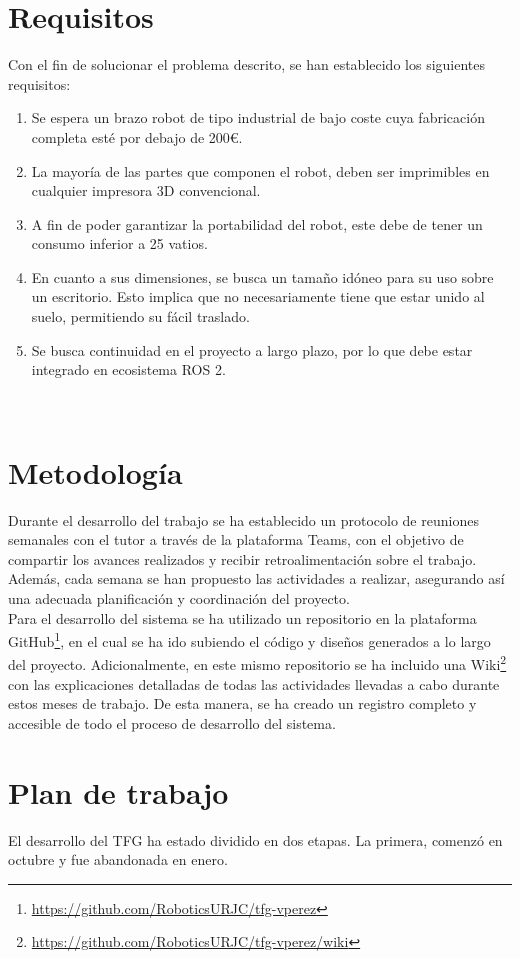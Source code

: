 \section{Requisitos}
\label{sec:requisitos}
Con el fin de solucionar el problema descrito, se han establecido los siguientes requisitos:
\begin{enumerate}
      \item Se espera un brazo robot de tipo industrial de bajo coste cuya fabricación completa esté por debajo de 200\euro.
      \item La mayoría de las partes que componen el robot, deben ser imprimibles en cualquier impresora 3D convencional.
      \item A fin de poder garantizar la portabilidad del robot, este debe de tener un consumo inferior a 25 vatios.
      \item En cuanto a sus dimensiones, se busca un tamaño idóneo para su uso sobre un escritorio. Esto implica que no necesariamente 
      tiene que estar unido al suelo, permitiendo su fácil traslado.
      \item Se busca continuidad en el proyecto a largo plazo, por lo que debe estar integrado en ecosistema \acs{ROS} 2. 

\end{enumerate}\

\section{Metodología}
\label{sec:metodologia}

Durante el desarrollo del trabajo se ha establecido un protocolo de reuniones semanales con el tutor a 
través de la plataforma Teams, con el objetivo de compartir los avances realizados y recibir retroalimentación 
sobre el trabajo. Además, cada semana se han propuesto las actividades a realizar, asegurando así una adecuada 
planificación y coordinación del proyecto. \\
Para el desarrollo del sistema se ha utilizado un repositorio en la plataforma GitHub\footnote{\url{https://github.com/RoboticsURJC/tfg-vperez}}, en el cual se ha ido
subiendo el código y diseños generados a lo largo del proyecto. Adicionalmente, en este mismo repositorio 
se ha incluido una Wiki\footnote{\url{https://github.com/RoboticsURJC/tfg-vperez/wiki}} con las explicaciones detalladas de todas las actividades llevadas a cabo durante estos 
meses de trabajo. De esta manera, se ha creado un registro completo y accesible de todo el proceso de desarrollo del sistema.

\section{Plan de trabajo}
\label{sec:plantrabajo}
El desarrollo del TFG ha estado dividido en dos etapas. La primera, comenzó en octubre y fue abandonada en enero. 